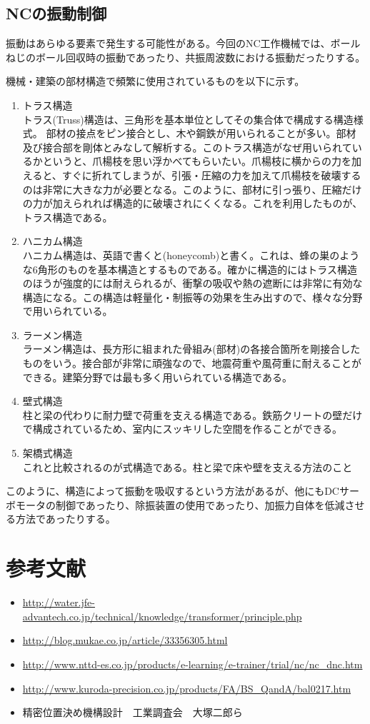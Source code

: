 \documentclass[a4j,twoside,openright,11pt]{jsarticle}
\begin{document}
\subsection{NCの振動制御}
振動はあらゆる要素で発生する可能性がある。今回のNC工作機械では、ボールねじのボール回収時の振動であったり、共振周波数における振動だったりする。\\
\par
機械・建築の部材構造で頻繁に使用されているものを以下に示す。
\begin{enumerate}
\item トラス構造\\
トラス(Truss)構造は、三角形を基本単位としてその集合体で構成する構造様式。
部材の接点をピン接合とし、木や鋼鉄が用いられることが多い。部材及び接合部を剛体とみなして解析する。このトラス構造がなぜ用いられているかというと、爪楊枝を思い浮かべてもらいたい。爪楊枝に横からの力を加えると、すぐに折れてしまうが、引張・圧縮の力を加えて爪楊枝を破壊するのは非常に大きな力が必要となる。このように、部材に引っ張り、圧縮だけの力が加えられれば構造的に破壊されにくくなる。これを利用したものが、トラス構造である。
\item ハニカム構造\\
ハニカム構造は、英語で書くと(honeycomb)と書く。これは、蜂の巣のような6角形のものを基本構造とするものである。確かに構造的にはトラス構造のほうが強度的には耐えられるが、衝撃の吸収や熱の遮断には非常に有効な構造になる。この構造は軽量化・制振等の効果を生み出すので、様々な分野で用いられている。
\item ラーメン構造\\
ラーメン構造は、長方形に組まれた骨組み(部材)の各接合箇所を剛接合したものをいう。接合部が非常に頑強なので、地震荷重や風荷重に耐えることができる。建築分野では最も多く用いられている構造である。
\item 壁式構造\\
柱と梁の代わりに耐力壁で荷重を支える構造である。鉄筋クリートの壁だけで構成されているため、室内にスッキリした空間を作ることができる。
\item 架橋式構造\\
これと比較されるのが式構造である。柱と梁で床や壁を支える方法のこと
\end{enumerate}
このように、構造によって振動を吸収するという方法があるが、他にもDCサーボモータの制御であったり、除振装置の使用であったり、加振力自体を低減させる方法であったりする。

\section{参考文献}
\begin{itemize}
\item \url{http://water.jfe-advantech.co.jp/technical/knowledge/transformer/principle.php}
\item \url{http://blog.mukae.co.jp/article/33356305.html}
\item \url{http://www.nttd-es.co.jp/products/e-learning/e-trainer/trial/nc/nc_dnc.htm}
\item \url{http://www.kuroda-precision.co.jp/products/FA/BS_QandA/bal0217.htm}
\item 精密位置決め機構設計　工業調査会　大塚二郎ら
\end{itemize}
\end{document}
